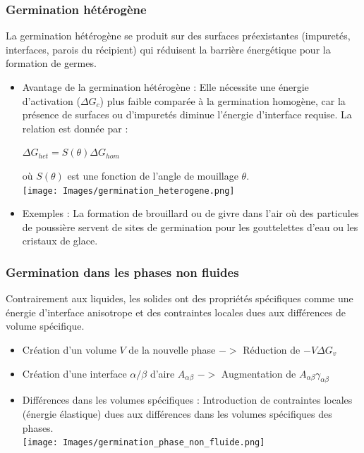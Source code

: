 \documentclass{article}
\begin{document}
        \subsubsection{Germination hétérogène}
        La germination hétérogène se produit sur des surfaces préexistantes (impuretés, interfaces, parois du récipient) qui réduisent la barrière énergétique pour la formation de germes.
        \begin{itemize}
            \item Avantage de la germination hétérogène : Elle nécessite une énergie d'activation ($\Delta G_c$) plus faible comparée à la germination homogène, car la présence de surfaces ou d'impuretés diminue l'énergie d'interface requise. La relation est donnée par :
            \begin{center}
                $\Delta G_{het} = S(\theta) \Delta G_{hom}$
            \end{center}
            où $S(\theta)$ est une fonction de l'angle de mouillage $\theta$. \\
                \texttt{[image: Images/germination\_heterogene.png]}
            \item Exemples : La formation de brouillard ou de givre dans l'air où des particules de poussière servent de sites de germination pour les gouttelettes d'eau ou les cristaux de glace.
        \end{itemize}

        \subsubsection{Germination dans les phases non fluides}
        Contrairement aux liquides, les solides ont des propriétés spécifiques comme une énergie d'interface anisotrope et des contraintes locales dues aux différences de volume spécifique.
        \begin{itemize}
            \item Création d'un volume $V$ de la nouvelle phase $->$ Réduction de $-V \Delta G_v$
            \item Création d'une interface $\alpha / \beta$ d'aire $A_{\alpha \beta}$ $->$ Augmentation de $A_{\alpha \beta} \gamma_{\alpha \beta}$
            \item Différences dans les volumes spécifiques : Introduction de contraintes locales (énergie élastique) dues aux différences dans les volumes spécifiques des phases. \\
                \texttt{[image: Images/germination\_phase\_non\_fluide.png]}
        \end{itemize}
    \pagebreak
\end{document}
